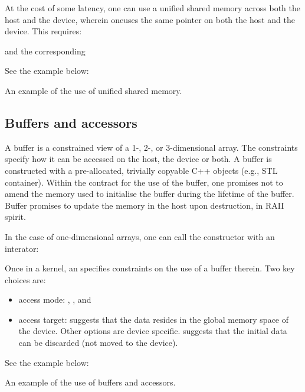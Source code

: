At the cost of some latency, one can use a unified shared memory across both the host and the device, wherein oneuses the same pointer on both the host and the device. This requires:
 

and the corresponding 


See the example below:
\raggedbottom
\begin{codebox}[]{\href{https://godbolt.org/z/}{\ExternalLink}}
\footnotesize An example of the use of unified shared memory.
\tcblower
{}
\end{codebox}
 
\subsection{Buffers and accessors}

A buffer is a constrained view of a 1-, 2-, or 3-dimensional array.
The constraints specify how it can be accessed on the host, the device or both. 
A buffer is constructed with a pre-allocated, trivially copyable C++ objects (e.g., STL container). 
Within the contract for the use of the buffer, 
one promises not to amend the memory used to initialise the buffer during the lifetime of the buffer. 
Buffer promises to update the memory in the host upon destruction, in RAII spirit. 

In the case of one-dimensional arrays, one can call the constructor with an interator:

Once in a kernel, an  specifies constraints on the use of a buffer therein. 
Two key choices are:
\begin{itemize}
\item access mode: , , and  
\item access target:  suggests that the data resides in the global memory space of the device. Other options are device specific.  suggests that the initial data can be discarded (not moved to the device). 
\end{itemize}

See the example below:
\raggedbottom
\begin{codebox}[]{\href{https://godbolt.org/z/}{\ExternalLink}}
\footnotesize An example of the use of buffers and accessors.
\tcblower
{}
\end{codebox}

